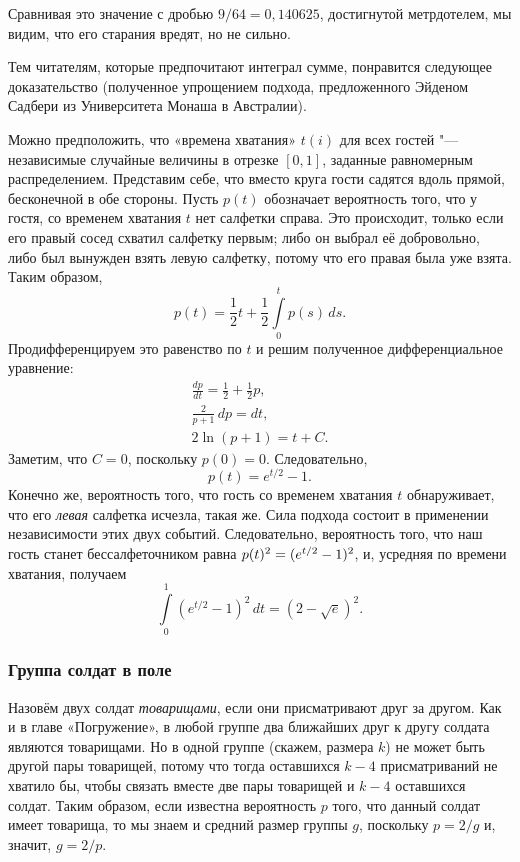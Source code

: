 \documentclass[twoside]{book}
\begin{document}
Сравнивая это значение с дробью $9/64 = 0{,}140625$, достигнутой метрдотелем, мы видим, что его старания вредят, но не сильно.

\medskip

Тем читателям, которые предпочитают интеграл сумме, понравится следующее доказательство (полученное упрощением подхода, предложенного Эйденом Садбери из Университета Монаша в Австралии).

\medskip

Можно предположить, что «времена хватания» $t(i)$ для всех гостей "--- независимые случайные величины в отрезке $[0,1]$, заданные равномерным распределением.
Представим себе, что вместо круга гости садятся вдоль прямой, бесконечной в обе стороны.
Пусть $p(t)$ обозначает вероятность того, что у гостя, со временем хватания $t$ нет салфетки справа.
Это происходит, только если его правый сосед схватил салфетку первым;
либо он выбрал её добровольно,
либо был вынужден взять левую салфетку, потому что его правая была уже взята.
Таким образом,
\[p(t)=\frac12t+\frac12\int\limits_0^tp(s)\,ds.\]
Продифференцируем это равенство по $t$ и решим полученное дифференциальное уравнение:
\begin{gather*}
\frac{dp}{dt}=\frac12+\frac12p,
\\
\frac2{p+1}\,dp=dt,
\\
2\ln(p+1)=t+C.
\end{gather*}
Заметим, что $C=0$, поскольку $p(0)=0$.
Следовательно,
\[p(t) = e^{t/2} - 1.\]
Конечно же, вероятность того, что гость со временем хватания $t$ обнаруживает, что его \emph{левая} салфетка исчезла, такая же.
Сила подхода состоит в применении независимости этих двух событий.
Следовательно, вероятность того, что наш гость станет бессалфеточником равна $p(t)^2 \z= (e^{t/2} -1)^2$, и, усредняя по времени хватания, получаем
\[\int\limits_0^1(e^{t/2}-1)^2\,dt=(2-\sqrt{e})^2.\]
\heartf

\subsubsection*{Группа солдат в поле}

Назовём двух солдат \emph{товарищами}, если они присматривают друг за другом.
Как и в главе «Погружение», в любой группе два ближайших друг к другу солдата являются товарищами.
Но в одной группе (скажем, размера $k$) не может быть другой пары товарищей, потому что тогда оставшихся $k-4$ присматриваний не хватило бы, чтобы связать вместе две пары товарищей и $k-4$ оставшихся солдат.
Таким образом, если известна вероятность $p$ того, что данный солдат имеет товарища, то мы знаем и средний размер группы $g$, поскольку $p = 2/g$ и, значит, $g = 2/p$.
\end{document}
